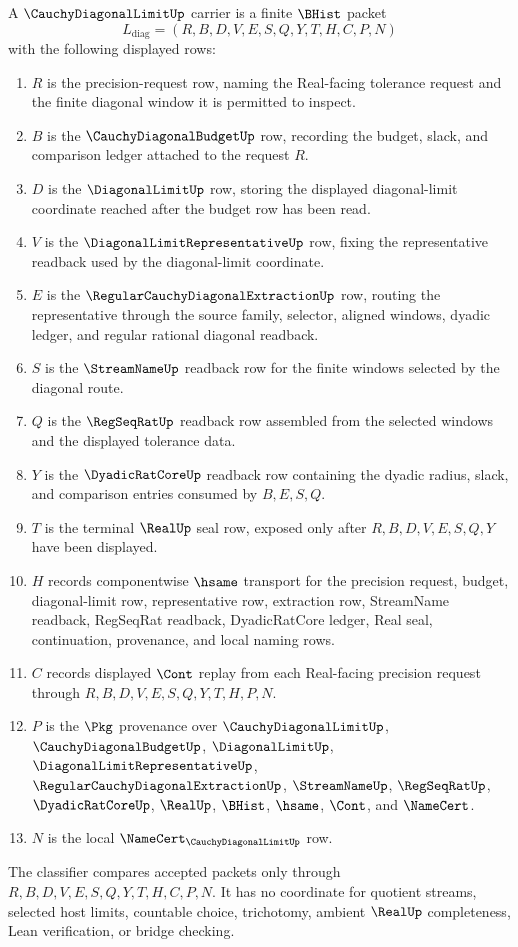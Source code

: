 \begin{definition}
\label{def:cauchy-diagonal-limit-carrier}
A $\CauchyDiagonalLimitUp$ carrier is a finite $\BHist$ packet
$$
L_{\mathrm{diag}}=(R,B,D,V,E,S,Q,Y,T,H,C,P,N)
$$
with the following displayed rows:
\begin{enumerate}
\item $R$ is the precision-request row, naming the Real-facing tolerance request and the finite diagonal window it is permitted to inspect.
\item $B$ is the $\CauchyDiagonalBudgetUp$ row, recording the budget, slack, and comparison ledger attached to the request $R$.
\item $D$ is the $\DiagonalLimitUp$ row, storing the displayed diagonal-limit coordinate reached after the budget row has been read.
\item $V$ is the $\DiagonalLimitRepresentativeUp$ row, fixing the representative readback used by the diagonal-limit coordinate.
\item $E$ is the $\RegularCauchyDiagonalExtractionUp$ row, routing the representative through the source family, selector, aligned windows, dyadic ledger, and regular rational diagonal readback.
\item $S$ is the $\StreamNameUp$ readback row for the finite windows selected by the diagonal route.
\item $Q$ is the $\RegSeqRatUp$ readback row assembled from the selected windows and the displayed tolerance data.
\item $Y$ is the $\DyadicRatCoreUp$ readback row containing the dyadic radius, slack, and comparison entries consumed by $B,E,S,Q$.
\item $T$ is the terminal $\RealUp$ seal row, exposed only after $R,B,D,V,E,S,Q,Y$ have been displayed.
\item $H$ records componentwise $\hsame$ transport for the precision request, budget, diagonal-limit row, representative row, extraction row, StreamName readback, RegSeqRat readback, DyadicRatCore ledger, Real seal, continuation, provenance, and local naming rows.
\item $C$ records displayed $\Cont$ replay from each Real-facing precision request through $R,B,D,V,E,S,Q,Y,T,H,P,N$.
\item $P$ is the $\Pkg$ provenance over $\CauchyDiagonalLimitUp$, $\CauchyDiagonalBudgetUp$, $\DiagonalLimitUp$, $\DiagonalLimitRepresentativeUp$, $\RegularCauchyDiagonalExtractionUp$, $\StreamNameUp$, $\RegSeqRatUp$, $\DyadicRatCoreUp$, $\RealUp$, $\BHist$, $\hsame$, $\Cont$, and $\NameCert$.
\item $N$ is the local $\NameCert_{\CauchyDiagonalLimitUp}$ row.
\end{enumerate}
The classifier compares accepted packets only through $R,B,D,V,E,S,Q,Y,T,H,C,P,N$. It has no coordinate for quotient streams, selected host limits, countable choice, trichotomy, ambient $\RealUp$ completeness, Lean verification, or bridge checking.
\end{definition}

